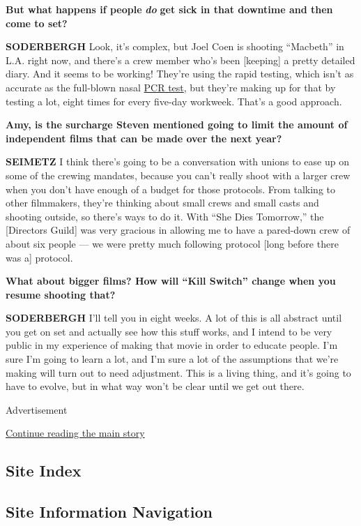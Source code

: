 \textbf{But what happens if people} \emph{\textbf{do}} \textbf{get sick
in that downtime and then come to set?}

\textbf{SODERBERGH} Look, it's complex, but Joel Coen is shooting
``Macbeth'' in L.A. right now, and there's a crew member who's been
{[}keeping{]} a pretty detailed diary. And it seems to be working!
They're using the rapid testing, which isn't as accurate as the
full-blown nasal
\href{https://www.nytimes3xbfgragh.onion/2020/07/06/health/fast-coronavirus-tests.html}{PCR
test}, but they're making up for that by testing a lot, eight times for
every five-day workweek. That's a good approach.

\textbf{Amy, is the surcharge Steven mentioned going to limit the amount
of independent films that can be made over the next year?}

\textbf{SEIMETZ} I think there's going to be a conversation with unions
to ease up on some of the crewing mandates, because you can't really
shoot with a larger crew when you don't have enough of a budget for
those protocols. From talking to other filmmakers, they're thinking
about small crews and small casts and shooting outside, so there's ways
to do it. With ``She Dies Tomorrow,'' the {[}Directors Guild{]} was very
gracious in allowing me to have a pared-down crew of about six people
--- we were pretty much following protocol {[}long before there was a{]}
protocol.

\textbf{What about bigger films? How will ``Kill Switch'' change when
you resume shooting that?}

\textbf{SODERBERGH} I'll tell you in eight weeks. A lot of this is all
abstract until you get on set and actually see how this stuff works, and
I intend to be very public in my experience of making that movie in
order to educate people. I'm sure I'm going to learn a lot, and I'm sure
a lot of the assumptions that we're making will turn out to need
adjustment. This is a living thing, and it's going to have to evolve,
but in what way won't be clear until we get out there.

Advertisement

\protect\hyperlink{after-bottom}{Continue reading the main story}

\hypertarget{site-index}{%
\subsection{Site Index}\label{site-index}}

\hypertarget{site-information-navigation}{%
\subsection{Site Information
Navigation}\label{site-information-navigation}}

